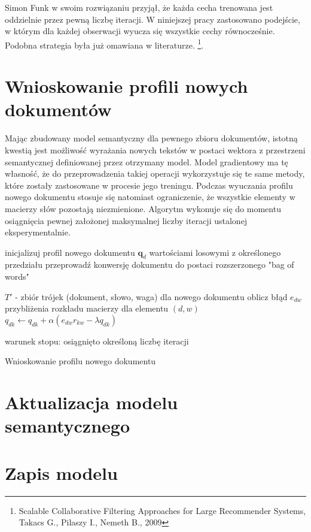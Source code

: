 \documentclass{pracamgr}
\begin{document}
Simon Funk w swoim rozwiązaniu przyjął, że każda cecha trenowana jest oddzielnie przez pewną liczbę iteracji. W niniejszej pracy zastosowano podejście, w którym dla każdej obserwacji wyucza się wszystkie cechy równocześnie. Podobna strategia była już omawiana w literaturze. \footnote{Scalable Collaborative Filtering Approaches for Large Recommender Systems, Takacs G., Pilaszy I., Nemeth B., 2009}.

\section{Wnioskowanie profili nowych dokumentów}

Mając zbudowany model semantyczny dla pewnego zbioru dokumentów, istotną kwestią jest możliwość wyrażania nowych tekstów w postaci wektora z przestrzeni semantycznej definiowanej przez otrzymany model. Model gradientowy ma tę własność, że do przeprowadzenia takiej operacji wykorzystuje się te same metody, które zostały zastosowane w procesie jego treningu. Podczas wyuczania profilu nowego dokumentu stosuje się natomiast ograniczenie, że wszystkie elementy w macierzy słów pozostają niezmienione. Algorytm wykonuje się do momentu osiągnięcia pewnej założonej maksymalnej liczby iteracji ustalonej eksperymentalnie.

\begin{algorithm}[H]
inicjalizuj profil nowego dokumentu $\mathbf{q}_d$ wartościami losowymi z określonego przedziału\;
przeprowadź konwersję dokumentu do postaci rozszerzonego "bag of words"\;
 {
    $T'$ - zbiór trójek (dokument, słowo, waga) dla nowego dokumentu\;
     {
        oblicz błąd $e_{dw}$ przybliżenia rozkładu macierzy dla elementu $(d, w)$\;
         { 
            $q_{dk} \gets q_{dk} + \alpha (e_{dw} r_{kw} - \lambda q_{dk})$\;
        }
    }
    
    warunek stopu: osiągnięto określoną liczbę iteracji
}
\caption{Wnioskowanie profilu nowego dokumentu}
\end{algorithm}

\section{Aktualizacja modelu semantycznego}

\section{Zapis modelu}
\end{document}
